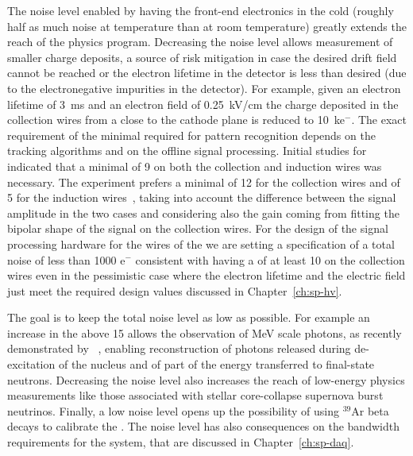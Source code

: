 The noise level enabled by having the front-end electronics in the cold (roughly 
half as much noise at  temperature than at room temperature) greatly 
extends the reach of the  physics program. Decreasing the noise level 
allows measurement of smaller charge deposits, a source of risk mitigation in 
case the desired drift field cannot be reached or the electron lifetime in the 
detector is less than desired (due to the electronegative impurities in the 
detector). For example, given an electron lifetime of \SI{3}{ms} and an electron field
of \SI{0.25}{kV/cm} the charge deposited in the collection wires from a 
 close to the cathode plane is reduced to \SI{10}{k}{e$^-$}.
The exact requirement of the minimal  required for pattern
recognition depends on the tracking algorithms and on the offline signal processing.
Initial studies for  indicated that a minimal  of 9 
on both the collection and induction wires was necessary. The 
 experiment prefers a minimal  of 12 for the
collection wires and of 5 for the induction wires~\cite{bib:sbnddoc1921}, taking into account
the difference between the signal amplitude in the two cases and considering
also the gain coming from fitting the bipolar shape of the signal on the
collection wires. For the design of the signal processing hardware for the
wires of the   we are setting a specification of
a total noise of less than 1000 e$^-$ consistent with having a 
of at least 10 on the collection wires even in the pessimistic case 
where the electron lifetime and the electric field just meet the
required design values discussed in Chapter~\ref{ch:sp-hv}.

The goal is to keep the total noise level as low as possible. For example an 
increase in the  above 15 allows the observation of MeV scale photons, 
as recently demonstrated by ~\cite{Acciarri:2018myr}, enabling 
reconstruction of photons released during de-excitation of the nucleus and of part
of the energy transferred to final-state neutrons.
Decreasing the noise level also increases the reach of low-energy 
physics measurements like those associated with stellar core-collapse supernova 
burst neutrinos. Finally, a low noise level opens up the possibility of using 
$\mathrm{{}^{39}Ar}$ beta decays to calibrate the  .
The noise level has also consequences on the bandwidth requirements
for the  system, that are discussed in Chapter~\ref{ch:sp-daq}.

